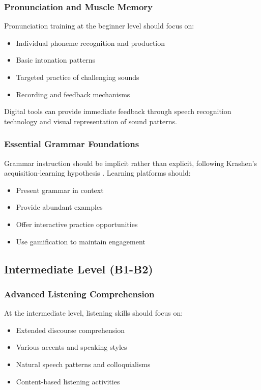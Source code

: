 \subsubsection{Pronunciation and Muscle Memory}
Pronunciation training at the beginner level should focus on:
\begin{itemize}
    \item Individual phoneme recognition and production
    \item Basic intonation patterns
    \item Targeted practice of challenging sounds
    \item Recording and feedback mechanisms
\end{itemize}
Digital tools can provide immediate feedback through speech recognition technology and visual representation of sound patterns.

\subsubsection{Essential Grammar Foundations}
Grammar instruction should be implicit rather than explicit, following Krashen's acquisition-learning hypothesis \citep{krashen1982principles}. Learning platforms should:
\begin{itemize}
    \item Present grammar in context
    \item Provide abundant examples
    \item Offer interactive practice opportunities
    \item Use gamification to maintain engagement
\end{itemize}

\subsection{Intermediate Level (B1-B2)}
\subsubsection{Advanced Listening Comprehension}
At the intermediate level, listening skills should focus on:
\begin{itemize}
    \item Extended discourse comprehension
    \item Various accents and speaking styles
    \item Natural speech patterns and colloquialisms
    \item Content-based listening activities
\end{itemize}

